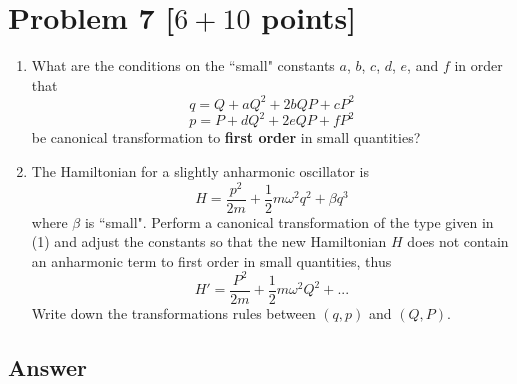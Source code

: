 \documentclass[11pt, a4paper]{article} %
\begin{document}
\newpage

\section*{Problem 7 [$6 + 10$ points]}
\begin{enumerate}
\item[(1)]  What are the conditions on the ``small" constants $a$, $b$, $c$, $d$, $e$, and $f$ in order that 
\begin{equation*}
    q= Q+ aQ^2+2bQP + cP^2
\end{equation*}
\begin{equation*}
   p=P+dQ^2+2eQP+fP^2
\end{equation*}
be canonical transformation to \textbf{first order} in small quantities?

\item[(2)] The Hamiltonian for a slightly anharmonic oscillator is 
\begin{equation*}
   H=\frac{p^2}{2m} + \frac{1}{2}m\omega^2q^2 + \beta q^3
\end{equation*}
where $\beta$ is ``small". Perform a canonical transformation of the type given in (1) and adjust the constants so that the new Hamiltonian $H$ does not contain an anharmonic term to first order in small quantities, thus 
\begin{equation*}
   H'=\frac{P^2}{2m} + \frac{1}{2}m\omega^2Q^2 + ...
\end{equation*}
Write down the transformations rules between $(q, p)$ and $(Q, P)$.
\end{enumerate}

\subsection*{Answer}
\end{document}
